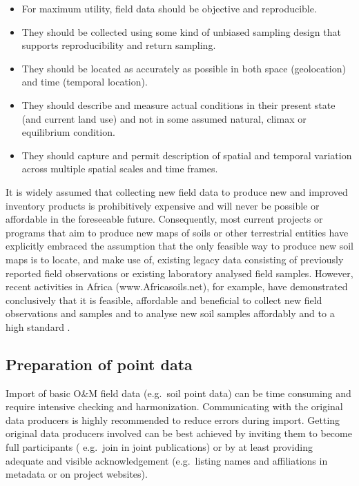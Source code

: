 \documentclass[graybox,natbib,nospthms,UStrade]{svmono}
\begin{document}
\begin{itemize}
\item
  For maximum utility, field data should be objective
  and reproducible.
\item
  They should be collected using some kind of unbiased sampling design
  that supports reproducibility and return sampling.
\item
  They should be located as accurately as possible in both
  space (geolocation) and time (temporal location).
\item
  They should describe and measure actual conditions in their present
  state (and current land use) and not in some assumed natural,
  climax or equilibrium condition.
\item
  They should capture and permit description of spatial and temporal
  variation across multiple spatial scales and time frames.
\end{itemize}

It is widely assumed that collecting new field data to produce new and
improved inventory products is prohibitively expensive and will never be
possible or affordable in the foreseeable future. Consequently, most
current projects or programs that aim to produce new maps of soils or
other terrestrial entities have explicitly embraced the assumption that
the only feasible way to produce new soil maps is to locate, and make
use of, existing legacy data consisting of previously reported field
observations or existing laboratory analysed field samples. However,
recent activities in Africa (www.Africasoils.net), for example, have
demonstrated conclusively that it is feasible, affordable and beneficial
to collect new field observations and samples and to analyse new soil
samples affordably and to a high standard \citep{ShepherdWalsh2007JNIS}.

\hypertarget{preparation-of-point-data}{%
\subsection{Preparation of point data}\label{preparation-of-point-data}}

Import of basic O\&M field data (e.g.~soil point data) can be time
consuming and require intensive checking and harmonization.
Communicating with the original data producers is highly recommended to
reduce errors during import. Getting original data producers involved
can be best achieved by inviting them to become full participants (
e.g.~join in joint publications) or by at least providing adequate and
visible acknowledgement (e.g.~listing names and affiliations in metadata
or on project websites).
\end{document}
